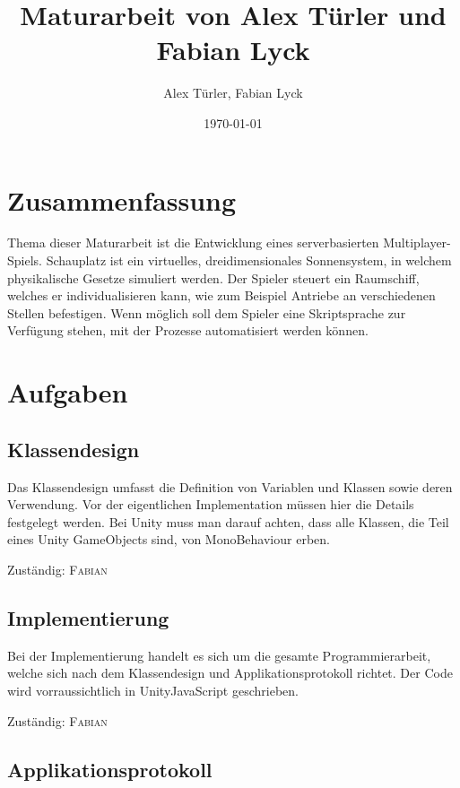 \documentclass[a4paper]{article}
\title {Maturarbeit von Alex Türler und Fabian Lyck}
\author {Alex Türler, Fabian Lyck}
\date {\today}
\begin{document}
\newcommand{\name}[1]{\textsc{#1}}
\renewcommand{\labelenumi}{\arabic{enumi}.}
\renewcommand{\labelenumii}{\arabic{enumi}.\arabic{enumii}}

\maketitle
\section{Zusammenfassung}
Thema dieser Maturarbeit ist die Entwicklung eines serverbasierten Multiplayer-Spiels. Schauplatz ist ein virtuelles, dreidimensionales Sonnensystem, in welchem physikalische Gesetze simuliert werden. Der Spieler steuert ein Raumschiff, welches er individualisieren kann, wie zum Beispiel Antriebe an verschiedenen Stellen befestigen. Wenn möglich soll dem Spieler eine Skriptsprache zur Verfügung stehen, mit der Prozesse automatisiert werden können.



\section{Aufgaben}
\subsection{Klassendesign}
Das Klassendesign umfasst die Definition von Variablen und Klassen sowie deren Verwendung. Vor der eigentlichen Implementation müssen hier die Details festgelegt werden.  Bei Unity muss man darauf achten, dass alle Klassen, die Teil eines Unity GameObjects sind, von MonoBehaviour erben.

Zuständig: \name{Fabian}

\subsection{Implementierung}

Bei der Implementierung handelt es sich um die gesamte Programmierarbeit, welche sich nach dem Klassendesign und Applikationsprotokoll richtet. Der Code wird vorraussichtlich in UnityJavaScript geschrieben.

Zuständig: \name{Fabian}

\subsection{Applikationsprotokoll}
\end{document}
